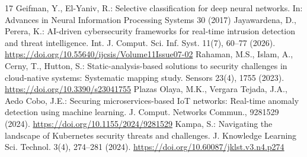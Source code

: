 \documentclass[runningheads]{llncs}
\begin{document}
\begin{thebibliography}{17}
 Geifman, Y., El-Yaniv, R.: Selective classification for deep neural networks. In: Advances in Neural Information Processing Systems 30 (2017)
 Jayawardena, D., Perera, K.: AI-driven cybersecurity frameworks for real-time intrusion detection and threat intelligence. Int. J. Comput. Sci. Inf. Syst. 11(7), 60--77 (2026). \url{https://doi.org/10.55640/ijcsis/Volume11Issue07-02}
 Rahaman, M.S., Islam, A., Cerny, T., Hutton, S.: Static-analysis-based solutions to security challenges in cloud-native systems: Systematic mapping study. Sensors 23(4), 1755 (2023). \url{https://doi.org/10.3390/s23041755}
 Plazas Olaya, M.K., Vergara Tejada, J.A., Aedo Cobo, J.E.: Securing microservices-based IoT networks: Real-time anomaly detection using machine learning. J. Comput. Networks Commun., 9281529 (2024). \url{https://doi.org/10.1155/2024/9281529}
 Kampa, S.: Navigating the landscape of Kubernetes security threats and challenges. J. Knowledge Learning Sci. Technol. 3(4), 274--281 (2024). \url{https://doi.org/10.60087/jklst.v3.n4.p274}
\end{thebibliography}
\end{document}
